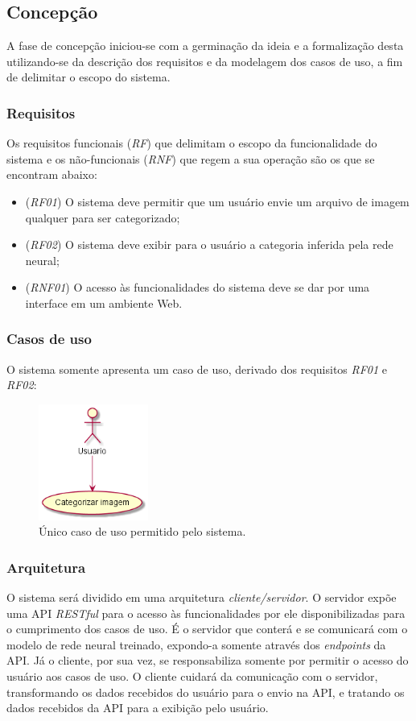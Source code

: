 \documentclass[12pt, a4paper]{article}
\begin{document}
\subsection{Concepção}
A fase de concepção iniciou-se com a germinação da ideia e a formalização desta utilizando-se da descrição dos requisitos e da modelagem dos casos de uso, a fim de delimitar o escopo do sistema.

\subsubsection{Requisitos}
Os requisitos funcionais (\emph{RF}) que delimitam o escopo da funcionalidade do sistema e os não-funcionais (\emph{RNF}) que regem a sua operação são os que se encontram abaixo:

\begin{itemize}
\item (\emph{RF01}) O sistema deve permitir que um usuário envie um arquivo de imagem qualquer para ser categorizado;
\item (\emph{RF02}) O sistema deve exibir para o usuário a categoria inferida pela rede neural;
\item (\emph{RNF01}) O acesso às funcionalidades do sistema deve se dar por uma interface em um ambiente Web.
\end{itemize}

\subsubsection{Casos de uso}
O sistema somente apresenta um caso de uso, derivado dos requisitos \emph{RF01} e \emph{RF02}:

\begin{figure}[H]
	\centering
	\includegraphics[width=\textwidth, height=3.8cm, keepaspectratio=true]{diagrams/usecase/UseCase}
	\caption{Único caso de uso permitido pelo sistema.}
\end{figure}

\subsubsection{Arquitetura}
O sistema será dividido em uma arquitetura \emph{cliente/servidor}. O servidor expõe uma API \emph{RESTful} para o acesso às funcionalidades por ele disponibilizadas para o cumprimento dos casos de uso. É o servidor que conterá e se comunicará com o modelo de rede neural treinado, expondo-a somente através dos \emph{endpoints} da API. Já o cliente, por sua vez, se responsabiliza somente por permitir o acesso do usuário aos casos de uso. O cliente cuidará da comunicação com o servidor, transformando os dados recebidos do usuário para o envio na API, e tratando os dados recebidos da API para a exibição pelo usuário.
\end{document}
